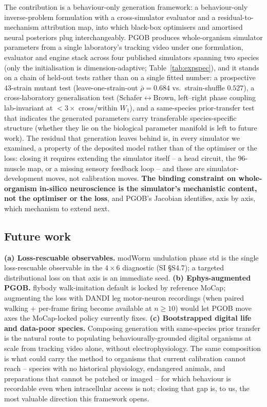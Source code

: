 \documentclass[11pt]{article}
\begin{document}
The contribution is a behaviour-only generation framework: a behaviour-only inverse-problem formulation with a cross-simulator evaluator and a residual-to-mechanism attribution map, into which black-box optimisers and amortised neural posteriors plug interchangeably. PGOB produces whole-organism simulator parameters from a single laboratory's tracking video under one formulation, evaluator and engine stack across four published simulators spanning two species (only the initialisation is dimension-adaptive; Table~\ref{tab:expspec}), and it stands on a chain of held-out tests rather than on a single fitted number: a prospective $43$-strain mutant test (leave-one-strain-out $\bar\rho{=}0.684$ vs.\ strain-shuffle $0.527$), a cross-laboratory generalisation test (Schafer$\leftrightarrow$Brown, left--right phase coupling lab-invariant at $<3\times$ cross/within $W_1$), and a same-species prior-transfer test that indicates the generated parameters carry transferable species-specific structure (whether they lie on the biological parameter manifold is left to future work). The residual that generation leaves behind is, in every simulator we examined, a property of the deposited model rather than of the optimiser or the loss: closing it requires extending the simulator itself -- a head circuit, the $96$-muscle map, or a missing sensory feedback loop -- and these are simulator-development moves, not calibration moves. \textbf{The binding constraint on whole-organism in-silico neuroscience is the simulator's mechanistic content, not the optimiser or the loss}, and PGOB's Jacobian identifies, axis by axis, which mechanism to extend next.

\subsection{Future work}

\textbf{(a) Loss-rescuable observables.} modWorm undulation phase std is the single loss-rescuable observable in the $4\times 6$ diagnostic (SI \S S4.7); a targeted distributional loss on that axis is an immediate seed. \textbf{(b) Ephys-augmented PGOB.} flybody walk-imitation default is locked by reference MoCap; augmenting the loss with DANDI leg motor-neuron recordings (when paired walking + per-frame firing become available at $n{\ge}10$) would let PGOB move axes the MoCap-locked policy currently fixes. \textbf{(c) Bootstrapped digital life and data-poor species.} Composing generation with same-species prior transfer is the natural route to populating behaviourally-grounded digital organisms at scale from tracking video alone, without electrophysiology. The same composition is what could carry the method to organisms that current calibration cannot reach -- species with no historical physiology, endangered animals, and preparations that cannot be patched or imaged -- for which behaviour is recordable even when intracellular access is not; closing that gap is, to us, the most valuable direction this framework opens.
\end{document}
